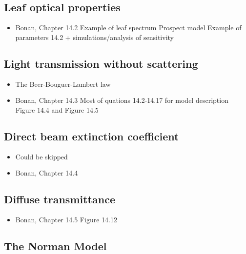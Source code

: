 \documentclass[
  oneside]{book}
\providecommand{\tightlist}{%
  \setlength{\itemsep}{0pt}\setlength{\parskip}{0pt}}
\begin{document}
\hypertarget{leaf-optical-properties}{%
\subsection{Leaf optical properties}\label{leaf-optical-properties}}

\begin{itemize}
\tightlist
\item
  Bonan, Chapter 14.2
  Example of leaf spectrum
  Prospect model
  Example of parameters 14.2 + simulations/analysis of sensitivity
\end{itemize}

\hypertarget{light-transmission-without-scattering}{%
\subsection{Light transmission without scattering}\label{light-transmission-without-scattering}}

\begin{itemize}
\tightlist
\item
  The Beer-Bouguer-Lambert law
\item
  Bonan, Chapter 14.3
  Most of quations 14.2-14.17 for model description
  Figure 14.4 and Figure 14.5
\end{itemize}

\hypertarget{direct-beam-extinction-coefficient}{%
\subsection{Direct beam extinction coefficient}\label{direct-beam-extinction-coefficient}}

\begin{itemize}
\tightlist
\item
  Could be skipped
\item
  Bonan, Chapter 14.4
\end{itemize}

\hypertarget{diffuse-transmittance}{%
\subsection{Diffuse transmittance}\label{diffuse-transmittance}}

\begin{itemize}
\tightlist
\item
  Bonan, Chapter 14.5
  Figure 14.12
\end{itemize}

\hypertarget{the-norman-model}{%
\subsection{The Norman Model}\label{the-norman-model}}
\end{document}
